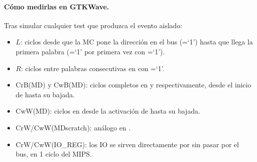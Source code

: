 \paragraph{C\'omo medirlas en GTKWave.} Tras simular cualquier test que produzca el
evento aislado:
\begin{itemize}[leftmargin=1.2em]
  \item $L$: ciclos desde que la MC pone la direcci\'on en el bus
    (=`1') hasta que llega la primera palabra
    (=`1' por primera vez con =`1').
  \item $R$: ciclos entre palabras consecutivas en  con
    =`1'.
  \item CrB(MD) y CwB(MD): ciclos completos en  y 
    respectivamente, desde el inicio de  hasta su bajada.
  \item CwW(MD): ciclos en  desde la activaci\'on de
     hasta su bajada.
  \item CrW/CwW(MDscratch): an\'alogo en .
  \item CrW/CwW(IO\_REG): los IO se sirven directamente por
     sin pasar por el bus, en 1 ciclo del MIPS.
\end{itemize}
